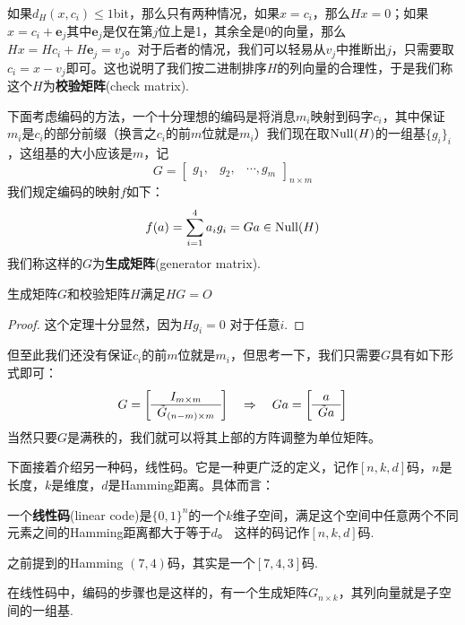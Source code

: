 如果$d_H(x, c_i) \le 1$bit，那么只有两种情况，如果$x=c_i$，那么$Hx=0$；如果$x = c_i + \bm{e}_j$其中$\bm{e}_j$是仅在第$j$位上是1，其余全是0的向量，那么$Hx = Hc_i + H\bm{e}_j = v_j$。对于后者的情况，我们可以轻易从$v_j$中推断出$j$，只需要取$c_i = x - v_j$即可。这也说明了我们按二进制排序$H$的列向量的合理性，于是我们称这个$H$为\textbf{校验矩阵}(check matrix). 

下面考虑编码的方法，一个十分理想的编码是将消息$m_i$映射到码字$c_i$，其中保证$m_i$是$c_i$的部分前缀（换言之$c_i$的前$m$位就是$m_i$）我们现在取$\operatorname*{Null}(H)$的一组基$\{g_i\}_i$，这组基的大小应该是$m$，记 
\[
G = \begin{bmatrix}
    g_1, & g_2, & \cdots ,g_{m}
\end{bmatrix}_{n \times m}
\]
我们规定编码的映射$f$如下：
\[
f(a) = \sum_{i=1}^4 a_i g_i = Ga \in \operatorname*{Null}(H)
\]
我们称这样的$G$为\textbf{生成矩阵}(generator matrix). 

\begin{theorem}
    生成矩阵$G$和校验矩阵$H$满足$HG=O$
\end{theorem}
\begin{proof}
    这个定理十分显然，因为$Hg_i= 0$ 对于任意$i$.
\end{proof}

但至此我们还没有保证$c_i$的前$m$位就是$m_i$，但思考一下，我们只需要$G$具有如下形式即可：
\[
G = \left[\begin{array}{c}
I_{m \times m} \\ \hline 
\tilde{G}_{(n-m)\times m}
\end{array}\right] \quad \Rightarrow \quad 
Ga = \left[\begin{array}{c}
a \\ \hline 
\tilde{G}a
\end{array}\right]
\]
当然只要$G$是满秩的，我们就可以将其上部的方阵调整为单位矩阵。

下面接着介绍另一种码，线性码。它是一种更广泛的定义，记作$[n,k,d]$码，$n$是长度，$k$是维度，$d$是Hamming距离。具体而言：
\begin{definition}[线性码]
    一个\textbf{线性码}(linear code)是$\{0,1\}^n$的一个$k$维子空间，满足这个空间中任意两个不同元素之间的Hamming距离都大于等于$d$。 这样的码记作$[n,k,d]$码. 
\end{definition}
\begin{example}
    之前提到的Hamming $(7,4)$码，其实是一个$[7,4,3]$码.
\end{example} 

在线性码中，编码的步骤也是这样的，有一个生成矩阵$G_{n\times k}$，其列向量就是子空间的一组基. 

